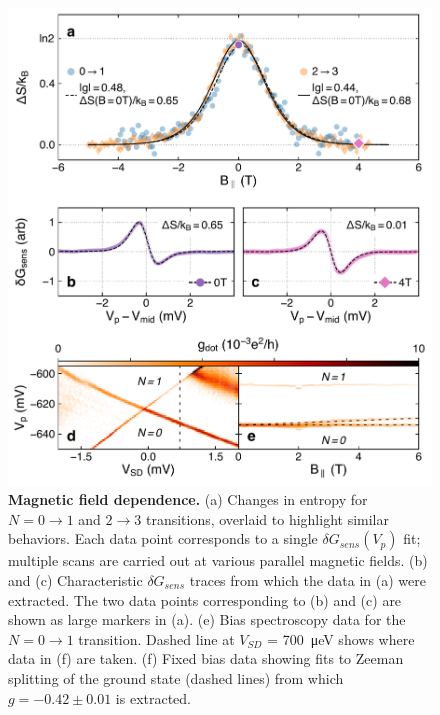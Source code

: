 \documentclass[twocolumn,showpacs,amsmath,amssymb,prl,aps,superscriptaddress]{revtex4-1}
\begin{document}
\begin{figure}
        \includegraphics[width=1.0\columnwidth]{../figures/figure_3.pdf}
        \caption{\label{fig:fig3} \textbf{Magnetic field dependence.} (a) Changes in entropy for $N=0 \rightarrow 1$ and $2 \rightarrow 3$ transitions, overlaid to highlight similar behaviors.  Each data point corresponds to a single $\delta G_{sens}(V_p)$ fit; multiple scans are carried out at various parallel magnetic fields.   (b) and (c) Characteristic $\delta G_{sens}$ traces from which the data in (a) were extracted. The two data points corresponding to (b) and (c) are shown as large markers in (a). (e) Bias spectroscopy data for the $N=0 \rightarrow 1$ transition. Dashed line at $V_{SD}$ = \SI{700}{\micro\electronvolt} shows where data in (f) are taken. (f) Fixed bias data showing fits to Zeeman splitting of the ground state (dashed lines) from which $g = -0.42 \pm 0.01$ is extracted.}
\end{figure}
\end{document}
